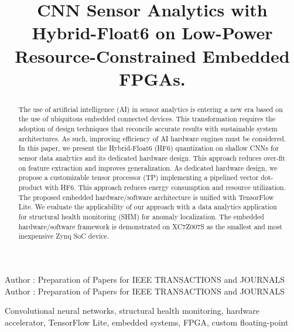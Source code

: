 \title {CNN Sensor Analytics with Hybrid-Float6 on Low-Power Resource-Constrained Embedded FPGAs.}



\markboth
{Author \headeretal: Preparation of Papers for IEEE TRANSACTIONS and JOURNALS}
{Author \headeretal: Preparation of Papers for IEEE TRANSACTIONS and JOURNALS}


\begin{abstract}
The use of artificial intelligence (AI) in sensor analytics is entering a new era based on the use of ubiquitous embedded connected devices. This transformation requires the adoption of design techniques that reconcile accurate results with sustainable system architectures. As such, improving efficiency of AI hardware engines must be considered. In this paper, we present the Hybrid-Float6 (HF6) quantization on shallow CNNs for sensor data analytics and its dedicated hardware design. This approach reduces over-fit on feature extraction and improves generalization. As dedicated hardware design, we propose a customizable tensor processor (TP) implementing a pipelined vector dot-product with HF6. This approach reduces energy consumption and resource utilization. The proposed embedded hardware/software architecture is unified with TensorFlow Lite. We evaluate the applicability of our approach with a data analytics application for structural health monitoring (SHM) for anomaly localization. The embedded hardware/software framework is demonstrated on XC7Z007S as the smallest and most inexpensive Zynq SoC device.
\end{abstract}

\begin{keywords}
Convolutional neural networks, structural health monitoring, hardware accelerator, TensorFlow Lite, embedded systems, FPGA, custom floating-point
\end{keywords}

\titlepgskip=-15pt

\maketitle